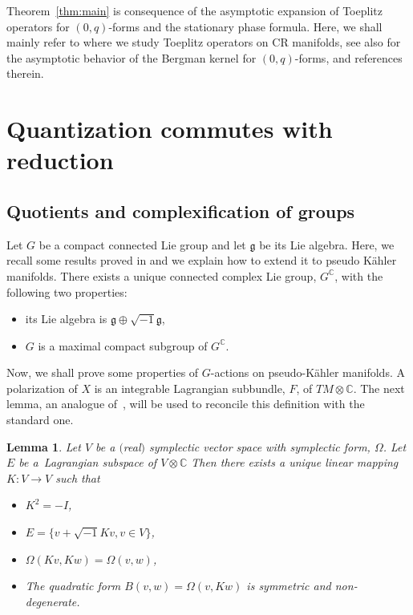 \documentclass[10pt,a4paper]{amsart}
\numberwithin{equation}{section}
\newtheorem{Lemma}[Theorem]{Lemma}
\begin{document}
 	Theorem~\ref{thm:main} is consequence of the asymptotic expansion of Toeplitz operators for $(0,q)$-forms and the stationary phase formula. Here, we shall mainly refer to \cite{gh} where we study Toeplitz operators on CR manifolds, see also \cite{hsiao,mm} for the asymptotic behavior of the Bergman kernel for $(0,q)$-forms, and references therein.
 	
 	\section{Quantization commutes with reduction}
 	\subsection{Quotients and complexification of groups}
 	\label{sec:quot}
 	
 	Let $G$ be a compact connected Lie group and let $\mathfrak{g}$ be its Lie algebra. Here, we recall some results proved in \cite[Section 4]{gs} and we explain how to extend it to pseudo K\"ahler manifolds. There exists a unique connected complex Lie group, $G^{\mathbb{C}}$, with the following two properties:
 	\begin{itemize}\itemsep=0pt
 		\item its Lie algebra is $\mathfrak{g}\oplus \sqrt{-1} \mathfrak{g}$,
 		\item $G$ is a maximal compact subgroup of $G^{\mathbb{C}}$.
 	\end{itemize}

 	Now, we shall prove some properties of $G$-actions on pseudo-K\"ahler manifolds. A polarization of $X$ is an integrable Lagrangian subbundle, $F$, of $TM\otimes \mathbb{C}$. The next lemma, an analogue of~\cite[Lemma 4.3]{gs}, will be used to reconcile this definition with the standard one.
 	
 	\begin{Lemma} \label{lem:gs} Let $V$ be a $($real$)$ symplectic vector space with symplectic form, $\Omega$. Let $E$ be a~Lagrangian subspace of $V\otimes \mathbb{C}$ Then there exists a unique linear mapping $K \colon V \rightarrow V$ such that
 	\begin{itemize}	\itemsep=0pt\samepage
 	\item[$(i)$] $K^2 = -I$,
 	\item[$(ii)$] $E=\big\{v+\sqrt{-1} Kv, v\in V\big\}$,
 	\item[$(iii)$] $\Omega(Kv, Kw)=\Omega(v, w)$,
 	\item[$(iv)$] The quadratic form $B(v, w)= \Omega(v, K w)$ is symmetric and non-degenerate.
 	\end{itemize}
 	\end{Lemma}
 	
\end{document}
